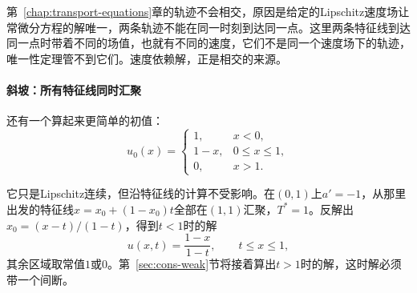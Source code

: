 第~\ref{chap:transport-equations}章的轨迹不会相交，原因是给定的Lipschitz速度场让常微分方程的解唯一，两条轨迹不能在同一时刻到达同一点。这里两条特征线到达同一点时带着不同的场值，也就有不同的速度，它们不是同一个速度场下的轨迹，唯一性定理管不到它们。速度依赖解，正是相交的来源。

\paragraph{斜坡：所有特征线同时汇聚}
还有一个算起来更简单的初值：
\begin{equation}
  u_0(x)=\begin{cases}1,&x<0,\\1-x,&0\leq x\leq1,\\0,&x>1.\end{cases}
  \label{eq:cons-ramp}
\end{equation}

它只是Lipschitz连续，但沿特征线的计算不受影响。在$(0,1)$上$a'=-1$，从那里出发的特征线$x=x_0+(1-x_0)t$全部在$(1,1)$汇聚，$T^{*}=1$。反解出$x_0=(x-t)/(1-t)$，得到$t<1$时的解
\begin{equation}
  u(x,t)=\frac{1-x}{1-t},\qquad t\leq x\leq1,
  \label{eq:cons-ramp-solution}
\end{equation}
其余区域取常值$1$或$0$。第~\ref{sec:cons-weak}节将接着算出$t>1$时的解，这时解必须带一个间断。
